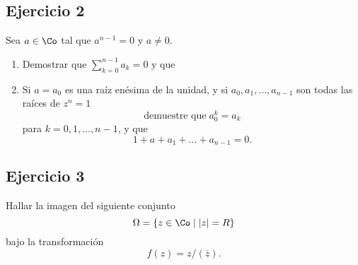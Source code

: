 \subsection*{Ejercicio 2}
	Sea $a \in \Co$ tal que $a^{n - 1} = 0 $ y $a\neq0$.
	\begin{enumerate}
		\item Demostrar que $\displaystyle \sum_{k=0}^{n-1}a_k = 0$ y que
		\item Si $a = a_0$ es una raíz enésima de la unidad, y si $a_0 , a_1 , \dots , a_{n-1}$ son todas las raíces de $z^n = 1$ 
		\[ \text{demuestre que}\; a_0^k = a_k \]
		para $k = 0, 1, \dots , n - 1$, y que 
		\[ 1 + a + a_1 + \dots + a_{n-1} = 0. \]
	\end{enumerate}

\subsection*{Ejercicio 3}
	Hallar la imagen del siguiente conjunto
	\[ \Omega = \{ z\in\Co \mid |z|=R \} \]
	bajo la transformación
	\[ f(z) = z/(\overline{z}). \]
